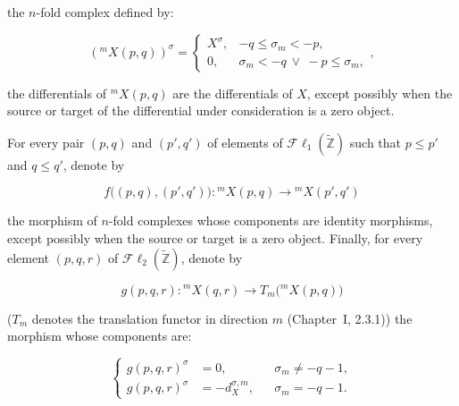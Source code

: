 \clearpage
{}%
\begingroup\small\setlength{\parskip}{0pt}\setlength{\emergencystretch}{1.5em}
\setlength{\abovedisplayskip}{4pt plus 2pt minus 2pt}%
\setlength{\belowdisplayskip}{4pt plus 2pt minus 2pt}%

\noindent the $n$-fold complex defined by:

\begin{equation}
({}^{m}\!X(p,q))^\sigma=
\begin{cases}
X^\sigma,&-q\leq\sigma_m<-p,\\
0,&\sigma_m<-q\ \lor\ -p\leq\sigma_m,
\end{cases},
\tag{4.1.6.1}
\end{equation}

\noindent the differentials of ${}^{m}\!X(p,q)$ are the differentials of $X$,
except possibly when the source or target of the differential under
consideration is a zero object.

For every pair $(p,q)$ and $(p',q')$ of elements of
$\mathcal{F}\ell_1(\widetilde{\mathbb Z})$ such that $p\leq p'$ and
$q\leq q'$, denote by

\begin{equation}
f\bigl((p,q),(p',q')\bigr)\colon
{}^{m}\!X(p,q)\longrightarrow{}^{m}\!X(p',q')
\tag{4.1.6.2}
\end{equation}

the morphism of $n$-fold complexes whose components are identity
morphisms, except possibly when the source or target is a zero object.
Finally, for every element $(p,q,r)$ of
$\mathcal{F}\ell_2(\widetilde{\mathbb Z})$, denote by

\begin{equation}
g(p,q,r)\colon{}^{m}\!X(q,r)
\longrightarrow T_m\bigl({}^{m}\!X(p,q)\bigr)
\tag{4.1.6.3}
\end{equation}

($T_m$ denotes the translation functor in direction $m$
(Chapter~I, 2.3.1)) the morphism whose components are:

\begin{equation}
\left\{
\begin{aligned}
g(p,q,r)^\sigma&=0,
  &&\sigma_m\neq-q-1,\\
g(p,q,r)^\sigma&=-d_X^{\sigma,m},
  &&\sigma_m=-q-1.
\end{aligned}
\right.
\tag{4.1.6.4}
\end{equation}

